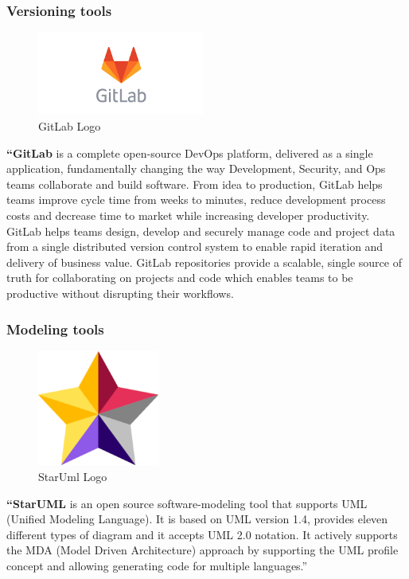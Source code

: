\documentclass[]{report}
\begin{document}
\subsubsection{Versioning tools}
\begin{figure}
	\includegraphics[width=5.5cm]{gitlab}
	\caption{GitLab Logo}
\end{figure} 

\textbf{“GitLab} is a complete open-source DevOps platform, delivered as a single application, fundamentally changing the way Development, Security, and Ops teams collaborate and build software. From idea to production, GitLab helps teams improve cycle time from weeks to minutes, reduce development process costs and decrease time to market while increasing developer productivity.
GitLab helps teams design, develop and securely manage code and project data from a single distributed version control system to enable rapid iteration and delivery of business value. GitLab repositories provide a scalable, single source of truth for collaborating on projects and code which enables teams to be productive without disrupting their workflows.


\subsubsection{Modeling tools}


\begin{figure}
	\includegraphics[width=4cm]{Staruml}
	\caption{StarUml Logo}
\end{figure} 


\textbf{“StarUML} is an open source software-modeling tool that supports UML (Unified Modeling Language). It is based on UML version 1.4, provides eleven different types of diagram and it accepts UML 2.0 notation. It actively supports the MDA (Model Driven Architecture) approach by supporting the UML profile concept and allowing generating code for multiple languages.”  \\\\\\\\\par
\end{document}
